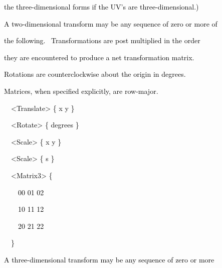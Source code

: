 \documentclass[a4paper]{article}
\newcommand\textstyleOOoComputerKeyWord[1]{\textrm{\textcolor[rgb]{0.0,0.0,0.5019608}{#1}}}
\begin{document}
{\color{black}
\textstyleOOoComputerKeyWord{\textcolor{black}{\ \ \ \ the three-dimensional forms if the UV's are
three-dimensional.)}}}


\bigskip

{\color{black}
\textstyleOOoComputerKeyWord{\textcolor{black}{\ \ \ \ A two-dimensional transform may be any sequence of zero or more
of}}}

{\color{black}
\textstyleOOoComputerKeyWord{\textcolor{black}{\ \ \ \ the following. \ Transformations are post multiplied in the
order}}}

{\color{black}
\textstyleOOoComputerKeyWord{\textcolor{black}{\ \ \ \ they are encountered to produce a net transformation matrix.}}}

{\color{black}
\textstyleOOoComputerKeyWord{\textcolor{black}{\ \ \ \ Rotations are counterclockwise about the origin in degrees.}}}

{\color{black}
\textstyleOOoComputerKeyWord{\textcolor{black}{\ \ \ \ Matrices, when specified explicitly, are row-major.}}}


\bigskip

{\color{black}
\textstyleOOoComputerKeyWord{\textcolor{black}{\ \ \ \ \ \ {\textless}Translate{\textgreater} \{ x y \}}}}

{\color{black}
\textstyleOOoComputerKeyWord{\textcolor{black}{\ \ \ \ \ \ {\textless}Rotate{\textgreater} \{ degrees \}}}}

{\color{black}
\textstyleOOoComputerKeyWord{\textcolor{black}{\ \ \ \ \ \ {\textless}Scale{\textgreater} \{ x y \}}}}

{\color{black}
\textstyleOOoComputerKeyWord{\textcolor{black}{\ \ \ \ \ \ {\textless}Scale{\textgreater} \{ s \}}}}


\bigskip

{\color{black}
\textstyleOOoComputerKeyWord{\textcolor{black}{\ \ \ \ \ \ {\textless}Matrix3{\textgreater} \{}}}

{\color{black}
\textstyleOOoComputerKeyWord{\textcolor{black}{\ \ \ \ \ \ \ \ 00 01 02}}}

{\color{black}
\textstyleOOoComputerKeyWord{\textcolor{black}{\ \ \ \ \ \ \ \ 10 11 12}}}

{\color{black}
\textstyleOOoComputerKeyWord{\textcolor{black}{\ \ \ \ \ \ \ \ 20 21 22}}}

{\color{black}
\textstyleOOoComputerKeyWord{\textcolor{black}{\ \ \ \ \ \ \}}}}


\bigskip

{\color{black}
\textstyleOOoComputerKeyWord{\textcolor{black}{\ \ \ \ A three-dimensional transform may be any sequence of zero or
more}}}
\end{document}
